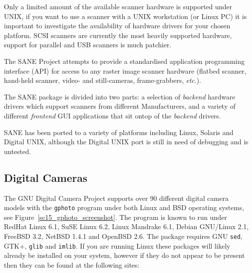 \documentclass[twoside,11pt]{article}
\newcommand{\htmladdnormallink}[2]{#1}
\newcommand{\xlabel}[1]{}
\begin{document}
Only a limited amount of the available scanner hardware is supported under UNIX, if you want to use a scanner with a UNIX workstation (or Linux PC)  it is important to investigate the availability of hardware drivers for your chosen platform. SCSI scanners are currently the most heavily supported hardware, support for parallel and USB scanners is much patchier.

The \htmladdnormallink{SANE Project}{http://www.mostang.com/sane/} attempts to provide a standardised application programming interface (API) for access to any raster image scanner hardware (flatbed scanner, hand-held scanner, video- and still-cameras, frame-grabbers, {\em etc.}). 

The SANE package is divided into two parts: a selection of {\em backend} hardware drivers which support scanners from different Manufacturers, and a variety of different {\em frontend} GUI applications that sit ontop of the {\em backend} drivers.

SANE has been \htmladdnormallink{ported}{http://www.mostang.com/sane/sane-support.html} to a variety of platforms including Linux, Solaris and Digital UNIX, although the Digital UNIX port is still in need of debugging and is untested. 

\subsection{\xlabel{sc15_camera}Digital Cameras\label{sc15_camera}}

The \htmladdnormallink{GNU Digital Camera Project}{http://www.gphoto.org/index.html} supports over 90 different digital camera models with the {\tt gphoto} program under both Linux and BSD operating systems, see Figure~\ref{sc15_gphoto_screenshot}. The program is known to run under RedHat Linux 6.1, SuSE Linux 6.2, Linux Mandrake 6.1, Debian GNU/Linux 2.1, FreeBSD 3.2, NetBSD 1.4.1 and OpenBSD 2.6. The package requires GNU {\tt sed}, GTK+, {\tt glib} and {\tt imlib}. If you are running Linux these packages will likely already be installed on your system, however if they do not appear to be present then they can be found at the following sites:
\end{document}
